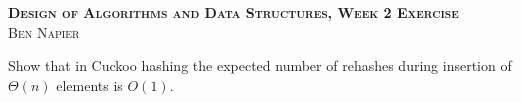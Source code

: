 \documentclass[a4paper, answers]{exam}
\begin{document}
\begin{center}
	\textbf{\textsc{Design of Algorithms and Data Structures, Week 2 Exercise}}
	\\
	\textsc{Ben Napier}
	\vspace{1em}
\end{center}

\begin{questions}
	\question Show that in Cuckoo hashing the expected number of rehashes during
	insertion of $\Theta(n)$ elements is $O(1)$.
\end{questions}
\end{document}
